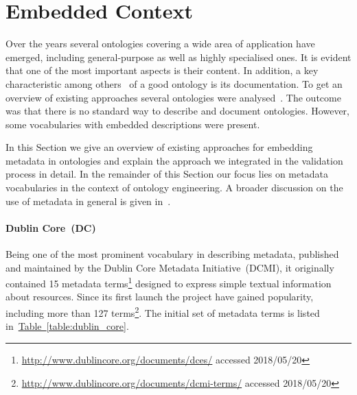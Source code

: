 \documentclass[draft,final]{vutinfth} %
\begin{document}
\section{Embedded Context}\label{sec:embedded_context}
Over the years several ontologies covering a wide area of application have emerged, including general-purpose as well as highly specialised ones. It is evident that one of the most important aspects is their content. In addition, a key characteristic among others~\cite{daquin2012} of a good ontology is its documentation. To get an overview of existing approaches several ontologies were analysed~\cite{dutta2017}. The outcome was that there is no standard way to describe and document ontologies. However, some vocabularies with embedded descriptions were present. 

In this Section we give an overview of existing approaches for embedding metadata in ontologies and explain the approach we integrated in the validation process in detail. In the remainder of this Section our focus lies on metadata vocabularies in the context of ontology engineering. A broader discussion on the use of metadata in general is given in~\cite{nilsson2010}. 

\paragraph{Dublin Core~(DC)} Being one of the most prominent vocabulary in describing metadata, published and maintained by the Dublin Core Metadata Initiative~(DCMI), it originally contained 15 metadata terms\footnote{\url{http://www.dublincore.org/documents/dces/} accessed 2018/05/20} designed to express simple textual information about resources. Since its first launch the project have gained popularity, including more than 127 terms\footnote{\url{http://www.dublincore.org/documents/dcmi-terms/} accessed 2018/05/20}. The initial set of metadata terms is listed in~\hyperref[table:dublin_core]{Table~\ref*{table:dublin_core}}. 
\end{document}
